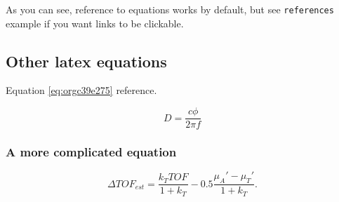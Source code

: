 As you can see, reference to equations works by default, but see \texttt{references}
example if you want links to be clickable.

\subsection{Other latex equations}
\label{sec:orgb0b7dd8}
Equation \ref{eq:orgc39e275} reference.

\begin{equation}
\label{eq:orgc39e275}
D = \frac{c\phi}{2\pi f}
\end{equation}

\subsubsection{A more complicated equation}
\label{sec:orgc7fef83}

\begin{equation}
\Delta TOF_{est} = \frac{k_T TOF}{1+k_T } - 0.5 \frac{\mu_A' - \mu_T'}{1+k_T}.
\end{equation}


